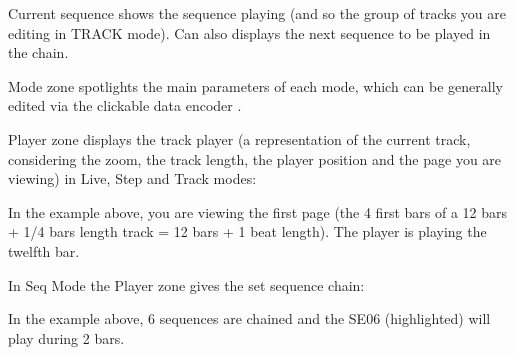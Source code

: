\textcolor{pyred}{Current sequence} shows the sequence playing (and so the group of tracks you are editing in TRACK mode). Can also displays the next sequence to be played in the chain.

\textcolor{pyblue}{Mode zone} spotlights the main parameters of each mode, which can be generally edited via the clickable data encoder \encodericon{}.

\textcolor{pyblue}{Player zone} displays the track player (a representation of the current track, considering the zoom, the track length, the player position and the page you are viewing) in Live, Step and Track modes:


In the example above, you are viewing the first page (the 4 first bars of a 12 bars + 1/4 bars length track = 12 bars + 1 beat length). The player is playing the twelfth bar.

In Seq Mode the \textcolor{pyblue}{Player zone} gives the set sequence chain:


In the example above, 6 sequences are chained and the SE06 (highlighted) will play during 2 bars.
